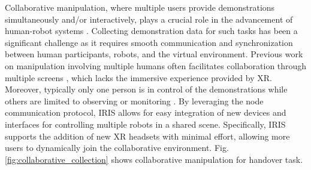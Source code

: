

Collaborative manipulation, where multiple users provide demonstrations simultaneously and/or interactively, plays a crucial role in the advancement of human-robot systems \cite{tung2021learning}.
Collecting demonstration data for such tasks has been a significant challenge as it requires smooth communication and synchronization between human participants, robots, and the virtual environment.
Previous work on manipulation involving multiple humans often facilitates collaboration through multiple screens  \cite{Qin2023AnyTeleopAG}, 
which lacks the immersive experience provided by XR.
Moreover, typically only one person is in control of the demonstrations while others are limited to observing or monitoring \cite{szczurek2023multimodal}.
By leveraging the node communication protocol,
IRIS allows for easy integration of new devices and interfaces for controlling multiple robots in a shared scene.
Specifically, IRIS supports the addition of new XR headsets with minimal effort,
allowing more users to dynamically join the collaborative environment.
Fig. \ref{fig:collaborative_collection} shows collaborative manipulation for handover task.

